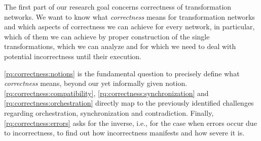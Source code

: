 The first part of our research goal concerns correctness of transformation networks.
We want to know what \emph{correctness} means for transformation networks and which aspects of correctness we can achieve for every network, in particular, which of them we can achieve by proper construction of the single transformations, which we can analyze and for which we need to deal with potential incorrectness until their execution.

\begin{researchquestions}
	\begin{subresearchquestions}
	\end{subresearchquestions}
\end{researchquestions}

\autoref{rq:correctness:notions} is the fundamental question to precisely define what \emph{correctness} means, beyond our yet informally given notion.
\autoref{rq:correctness:compatibility}, \autoref{rq:correctness:synchronization} and \autoref{rq:correctness:orchestration} directly map to the previously identified challenges regarding orchestration, synchronization and contradiction.
Finally, \autoref{rq:correctness:errors} asks for the inverse, i.e., for the case when errors occur due to incorrectness, to find out how incorrectness manifests and how severe it is.


